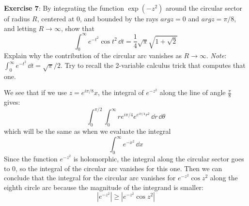 \documentclass{article}
\begin{document}
\textbf{Exercise 7}: By integrating the function $\exp(-z^{2})$ around the circular sector of radius $R$, centered at $0$, and bounded by the rays $arg{z} = 0$ and $arg{z} = \pi/8$, and letting $R \rightarrow \infty$, show that 
    \begin{equation*}
        \int_{0}^{\infty} e^{-t^{2}}\cos{t^{2}} \, \dd{t} = \dfrac{1}{4}\sqrt{\pi}\sqrt{1 + \sqrt{2}}
    \end{equation*}
Explain why the contribution of the circular arc vanishes as $R \rightarrow \infty$. \textit{Note}: $\int_{0}^{\infty} e^{-t^{2}} \, \dd{t} = \sqrt{\pi}/2$. Try to recall the 2-variable calculus trick that computes that one.
    \begin{answer}
        We see that if we use $z = e^{i\pi/8}x$, the integral of $e^{-z^{2}}$ along the line of angle $\frac{\pi}{8}$ gives:
            \begin{equation*}
                \int_{0}^{\pi/2} \int_{0}^{\infty} re^{i\pi/4}e^{e^{i\pi/4}r^{2}} \, \dd{r}  \, \dd{\theta} 
            \end{equation*}
        which will be the same as when we evaluate the integral
            \begin{equation*}
                \int_{0}^{\infty} e^{-x^{2}} \, \dd{x} 
            \end{equation*}
        Since the function $e^{-z^{2}}$ is holomorphic, the integral along the circular sector goes to $0$, so the integral of the circular arc vanishes for this one. Then we can conclude that the integral for the circular arc vanishes for $e^{-z^{2}}\cos{z^{2}}$ along the eighth circle arc because the magnitude of the integrand is smaller:
            \begin{equation*}
                \left\lvert e^{-z^{2}} \right\rvert \geq \left\lvert e^{-z^{2}}\cos{z^{2}} \right\rvert
            \end{equation*}


\end{answer}
\end{document}
